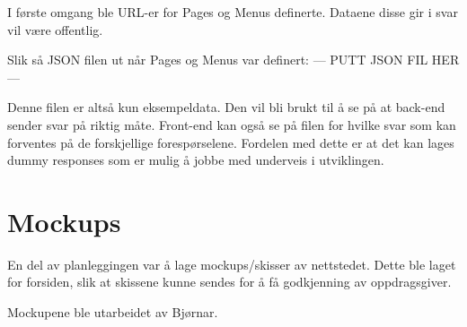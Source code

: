 I første omgang ble URL-er for Pages og Menus definerte. Dataene disse gir i svar vil være offentlig. 

Slik så JSON filen ut når Pages og Menus var definert:
--- PUTT JSON FIL HER ---

Denne filen er altså kun eksempeldata. Den vil bli brukt til å se på at back-end sender svar på riktig måte. Front-end kan også se på filen for hvilke svar som kan forventes på de forskjellige forespørselene. Fordelen med dette er at det kan lages dummy responses som er mulig å jobbe med underveis i utviklingen.


\section{Mockups}
En del av planleggingen var å lage mockups/skisser av nettstedet. Dette ble laget for forsiden, slik at skissene kunne sendes for å få godkjenning av oppdragsgiver.

Mockupene ble utarbeidet av Bjørnar. 

